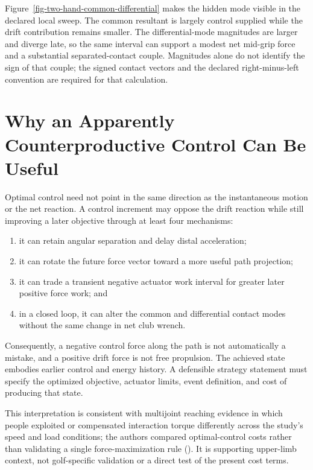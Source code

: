 \documentclass[
  letterpaper,
]{report}
\providecommand{\tightlist}{%
  \setlength{\itemsep}{0pt}\setlength{\parskip}{0pt}}
\begin{document}
Figure~\ref{fig-two-hand-common-differential} makes the hidden mode
visible in the declared local sweep. The common resultant is largely
control supplied while the drift contribution remains smaller. The
differential-mode magnitudes are larger and diverge late, so the same
interval can support a modest net mid-grip force and a substantial
separated-contact couple. Magnitudes alone do not identify the sign of
that couple; the signed contact vectors and the declared
right-minus-left convention are required for that calculation.

\section{Why an Apparently Counterproductive Control Can Be
Useful}\label{sec-counterintuitive-control}

Optimal control need not point in the same direction as the
instantaneous motion or the net reaction. A control increment may oppose
the drift reaction while still improving a later objective through at
least four mechanisms:

\begin{enumerate}
\def\labelenumi{\arabic{enumi}.}
\tightlist
\item
  it can retain angular separation and delay distal acceleration;
\item
  it can rotate the future force vector toward a more useful path
  projection;
\item
  it can trade a transient negative actuator work interval for greater
  later positive force work; and
\item
  in a closed loop, it can alter the common and differential contact
  modes without the same change in net club wrench.
\end{enumerate}

Consequently, a negative control force along the path is not
automatically a mistake, and a positive drift force is not free
propulsion. The achieved state embodies earlier control and energy
history. A defensible strategy statement must specify the optimized
objective, actuator limits, event definition, and cost of producing that
state.

This interpretation is consistent with multijoint reaching evidence in
which people exploited or compensated interaction torque differently
across the study's speed and load conditions; the authors compared
optimal-control costs rather than validating a single force-maximization
rule (). It is
supporting upper-limb context, not golf-specific validation or a direct
test of the present cost terms.
\end{document}
